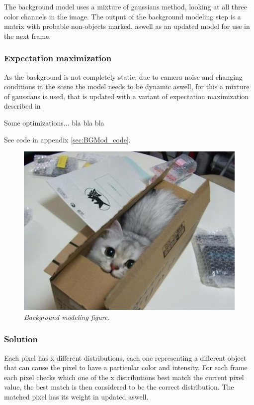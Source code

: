 The background model uses a mixture of gaussians method, looking at all three color channels in the image. The output of the background modeling step is a matrix with probable non-objects marked, aswell as an updated model for use in the next frame.

\subsubsection{Expectation maximization}

As the background is not completely static, due to camera noise and changing conditions in the scene the model needs to be dynamic aswell, for this a mixture of gaussians is used, that is updated with a variant of expectation maximization described in \cite{wood}

Some optimizations... bla bla bla

See code in appendix \ref{sec:BGMod_code}. %

\begin{figure}[htb]
	\centering
	\includegraphics[width=\linewidth]{images/acatisfinetoo}
	\caption{\textit{Background modeling figure.}}
	\label{fig:BGModeling_fig} %
\end{figure}

\subsubsection{Solution}

Each pixel has x different distributions, each one representing a different object that can cause the pixel to have a particular color and intensity. For each frame each pixel checks which one of the x distributions best match the current pixel value, the best match is then considered to be the correct distribution. The matched pixel has its weight in updated aswell. 


